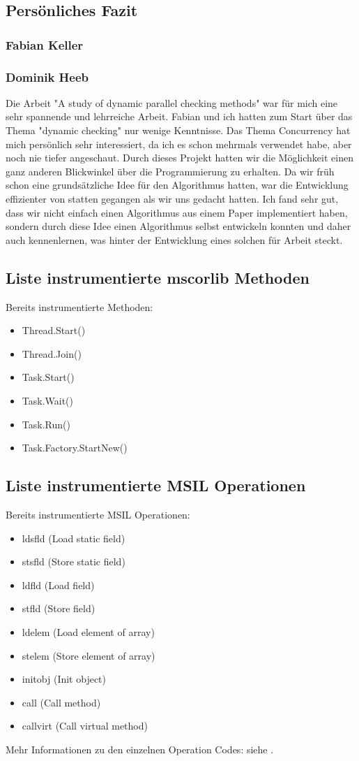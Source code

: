 \documentclass[10pt,a4paper]{article}
\begin{document}
\subsection*{Persönliches Fazit}
\subsubsection*{Fabian Keller}
\subsubsection*{Dominik Heeb}
Die Arbeit "A study of dynamic parallel checking methods" war für mich eine sehr spannende und lehrreiche Arbeit. Fabian und ich hatten zum Start über das Thema "dynamic checking" nur wenige Kenntnisse. Das Thema Concurrency hat mich persönlich sehr interessiert, da ich es schon mehrmals verwendet habe, aber noch nie tiefer angeschaut. Durch dieses Projekt hatten wir die Möglichkeit einen ganz anderen Blickwinkel über die Programmierung zu erhalten. Da wir früh schon eine grundsätzliche Idee für den Algorithmus hatten, war die Entwicklung effizienter von statten gegangen als wir uns gedacht hatten. Ich fand sehr gut, dass wir nicht einfach einen Algorithmus aus einem Paper implementiert haben, sondern durch diese Idee einen Algorithmus selbst entwickeln konnten und daher auch kennenlernen, was hinter der Entwicklung eines solchen für Arbeit steckt.
\subsection*{Liste instrumentierte mscorlib Methoden}\label{sec:instrumentierte_methoden}
Bereits instrumentierte Methoden:
\begin{itemize}
\setlength\itemsep{0em}
\item Thread.Start()
\item Thread.Join()
\item Task.Start()
\item Task.Wait()
\item Task.Run()
\item Task.Factory.StartNew()
\end{itemize}
\subsection*{Liste instrumentierte MSIL Operationen}
Bereits instrumentierte MSIL Operationen:
\begin{itemize}
\setlength\itemsep{0em}
\item ldsfld (Load static field)
\item stsfld (Store static field)
\item ldfld (Load field)
\item stfld (Store field)
\item ldelem (Load element of array)
\item stelem (Store element of array)
\item initobj (Init object)
\item call (Call method)
\item callvirt (Call virtual method)
\end{itemize}
Mehr Informationen zu den einzelnen Operation Codes: siehe \cite{ecma}.
\end{document}
